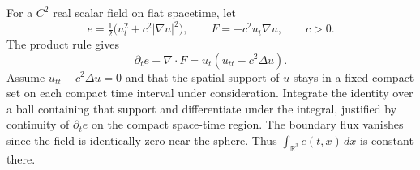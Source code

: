 For a \(C^2\) real scalar field on flat spacetime, let
\[
 e = \tfrac12\bigl(u_t^2+c^2|\nabla u|^2\bigr),\qquad
 F = -c^2 u_t\nabla u,\qquad c>0.
\]
The product rule gives
\[
 \partial_t e + \nabla\cdot F = u_t(u_{tt}-c^2\Delta u).
\]
Assume \(u_{tt}-c^2\Delta u=0\) and that the spatial support of \(u\) stays in a
fixed compact set on each compact time interval under consideration.
Integrate the identity over a ball containing that support and differentiate
under the integral, justified by continuity of \(\partial_t e\) on the compact
space-time region. The boundary flux vanishes since the field is identically
zero near the sphere. Thus \(\int_{\mathbb R^3}e(t,x)\,dx\) is constant there.
